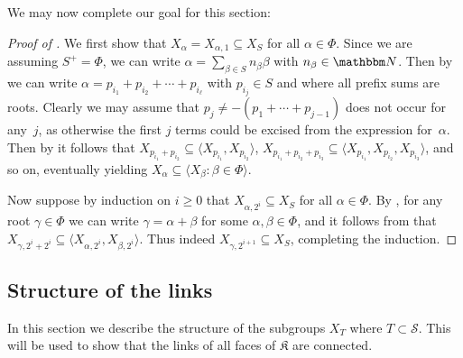 \documentclass[10pt,a4paper]{article}
\theoremstyle{definition}
\newcommand{\N}{\mathbbm N}
\newcommand{\complex}{\mathfrak{K}}
\begin{document}


We may now complete our goal for this section:
\begin{proof}[Proof of ]
We first show that $X_{\alpha} = X_{\alpha,1} \subseteq X_S$ for all $\alpha \in \Phi$.
Since we are assuming $S^+ = \Phi$, we can write $\alpha = \sum_{\beta \in S} n_\beta \beta$ with $n_\beta \in \N$.
Then by  we can write $\alpha = p_{i_1}+p_{i_2}  + \cdots + p_{i_\ell}$ with $p_{i_j} \in S$ and where all prefix sums are roots.
Clearly we may assume that $p_{j} \neq -(p_1 + \cdots + p_{j-1})$ does not occur for any~$j$, as otherwise the first $j$ terms could be excised from the expression for~$\alpha$.
Then by  it follows that $X_{p_{i_1} + p_{i_2}} \subseteq \langle X_{p_{i_1}},X_{p_{i_2}} \rangle$, $X_{p_{i_1}+p_{i_2}+p_{i_3}} \subseteq \langle X_{p_{i_1}},X_{p_{i_2}},X_{p_{i_3}} \rangle$, and so on, eventually yielding $X_\alpha \subseteq \langle X_\beta : \beta \in \Phi \rangle$.

Now suppose by induction on $i \geq 0$ that $X_{\alpha,2^i} \subseteq X_S$ for all $\alpha \in \Phi$. By , for any  root $\gamma \in \Phi$ we can write $\gamma = \alpha + \beta$ for some $\alpha, \beta \in \Phi$, and it follows from  that $X_{\gamma, 2^i+2^i} \subseteq \langle X_{\alpha,2^i},X_{\beta,2^i} \rangle$. Thus indeed $X_{\gamma,2^{i+1}} \subseteq X_S$, completing the induction.
\end{proof}


\subsection{Structure of the links}
In this section we describe the structure of the subgroups $X_T$ where $T \subset \mathcal{S}$. This will be used to show that the links of all faces of $\complex$ are connected.
\end{document}
